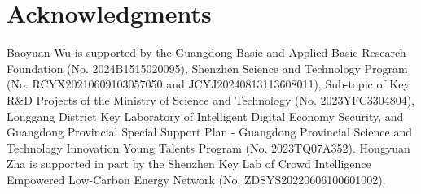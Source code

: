 \section*{Acknowledgments}
Baoyuan Wu is supported by the Guangdong Basic and Applied Basic Research Foundation (No. 2024B1515020095), 
Shenzhen Science and Technology Program (No. RCYX20210609103057050 and JCYJ20240813113608011), 
Sub-topic of Key R\&D Projects of the Ministry of Science and Technology (No. 2023YFC3304804), 
Longgang District Key Laboratory of Intelligent Digital Economy Security, and Guangdong Provincial Special Support Plan - Guangdong Provincial Science and Technology Innovation Young Talents Program (No. 2023TQ07A352). 
Hongyuan Zha is supported in part by the Shenzhen Key Lab of Crowd Intelligence Empowered Low-Carbon Energy Network (No.
ZDSYS20220606100601002).


